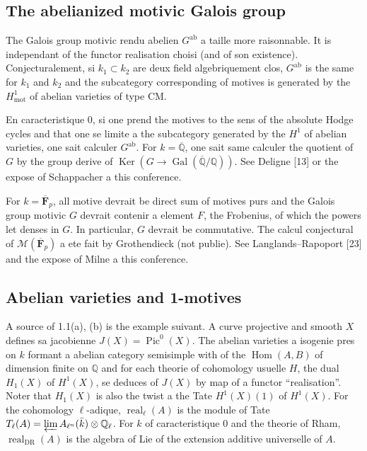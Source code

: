 \documentclass[11pt,a4paper]{article}
\theoremstyle{plain}
\theoremstyle{definition}
\DeclareMathOperator{\Hom}{Hom}
\DeclareMathOperator{\Ker}{Ker}
\DeclareMathOperator{\Gal}{Gal}
\DeclareMathOperator{\Pic}{Pic}
\newcommand{\Q}{\mathbb{Q}}
\newcommand{\Qell}{\mathbb{Q}_\ell}
\DeclareMathOperator{\mot}{mot}
\DeclareMathOperator{\real}{real}
\DeclareMathOperator{\DR}{DR}
\newcommand{\ab}{\mathrm{ab}}
\begin{document}
\subsection{The abelianized motivic Galois group}

The Galois group motivic rendu abelien $G^{\ab}$ a taille more raisonnable. It is independant of the functor realisation choisi (and of son existence). Conjecturalement, si $k_1 \subset k_2$ are deux field algebriquement clos, $G^{\ab}$ is the same for $k_1$ and $k_2$ and the subcategory corresponding of motives is generated by the $H^1_{\mot}$ of abelian varieties of type CM.

En caracteristique $0$, si one prend the motives to the sens of the absolute Hodge cycles and that one se limite a the subcategory generated by the $H^1$ of abelian varieties, one sait calculer $G^{\ab}$. For $k = \overline{\Q}$, one sait same calculer the quotient of $G$ by the group derive of $\Ker(G \to \Gal(\overline{\Q}/\Q))$. See Deligne [13] or the expose of Schappacher a this conference.

For $k = \overline{\mathbf{F}}_p$, all motive devrait be direct sum of motives purs and the Galois group motivic $G$ devrait contenir a element $F$, the Frobenius, of which the powers let denses in $G$. In particular, $G$ devrait be commutative. The calcul conjectural of $\mathcal{M}(\overline{\mathbf{F}}_p)$ a ete fait by Grothendieck (not publie). See Langlands--Rapoport [23] and the expose of Milne a this conference.

\subsection{Abelian varieties and 1-motives}

A source of 1.1(a), (b) is the example suivant. A curve projective and smooth $X$ defines sa jacobienne $J(X) = \Pic^0(X)$. The abelian varieties a isogenie pres on $k$ formant a abelian category semisimple with of the $\Hom(A, B)$ of dimension finite on $\Q$ and for each theorie of cohomology usuelle $H$, the dual $H_1(X)$ of $H^1(X)$, se deduces of $J(X)$ by map of a functor ``realisation''. Noter that $H_1(X)$ is also the twist a the Tate $H^1(X)(1)$ of $H^1(X)$. For the cohomology $\ell$-adique, $\real_{\ell}(A)$ is the module of Tate $T_{\ell}(A) = \varprojlim A_{\ell^n}(\bar{k}) \otimes \Qell$. For $k$ of caracteristique $0$ and the theorie of Rham, $\real_{\DR}(A)$ is the algebra of Lie of the extension additive universelle of $A$.
\end{document}
